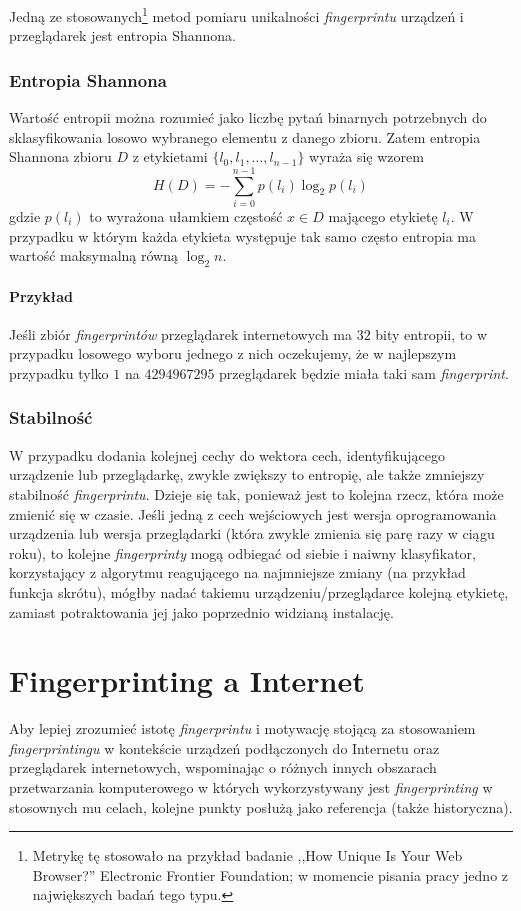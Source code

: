 Jedną ze stosowanych\footnote{Metrykę tę stosowało na przykład badanie ,,How
	Unique Is Your Web Browser?'' Electronic Frontier Foundation; w momencie
pisania pracy jedno z największych badań tego typu.} metod pomiaru unikalności
\emph{fingerprintu} urządzeń i przeglądarek jest entropia Shannona.

\subsubsection{Entropia Shannona}
Wartość entropii można rozumieć jako liczbę pytań binarnych potrzebnych do
sklasyfikowania losowo wybranego elementu z danego zbioru. Zatem entropia
Shannona zbioru \(D\) z etykietami \(\{l_{0}, l_{1}, \dots, l_{n - 1}\}\) wyraża
się wzorem \[H(D) = -{\sum_{i = 0}^{n - 1}{p(l_{i})\log_{2}{p(l_{i})}}}\] gdzie
\(p(l_{i})\) to wyrażona ułamkiem częstość \(x \in D\) mającego etykietę
\(l_{i}\). W przypadku w którym każda etykieta występuje tak samo często
entropia ma wartość maksymalną równą \(\log_{2}{n}\).

\paragraph{Przykład}
Jeśli zbiór \emph{fingerprintów} przeglądarek internetowych ma \(32\) bity
entropii, to w przypadku losowego wyboru jednego z nich oczekujemy, że w
najlepszym przypadku tylko \(1\) na \(4294967295\) przeglądarek będzie miała
taki sam \emph{fingerprint}.

\subsubsection{Stabilność}
W przypadku dodania kolejnej cechy do wektora cech, identyfikującego urządzenie
lub przeglądarkę, zwykle zwiększy to entropię, ale także zmniejszy stabilność
\emph{fingerprintu}. Dzieje się tak, ponieważ jest to kolejna rzecz, która może
zmienić się w czasie. Jeśli jedną z cech wejściowych jest wersja oprogramowania
urządzenia lub wersja przeglądarki (która zwykle zmienia się parę razy w ciągu
roku), to kolejne \emph{fingerprinty} mogą odbiegać od siebie i naiwny
klasyfikator, korzystający z algorytmu reagującego na najmniejsze zmiany (na
przykład funkcja skrótu), mógłby nadać takiemu urządzeniu/przeglądarce kolejną
etykietę, zamiast potraktowania jej jako poprzednio widzianą instalację.

\section{Fingerprinting a Internet} %
Aby lepiej zrozumieć istotę \emph{fingerprintu} i motywację stojącą za
stosowaniem \emph{fingerprintingu} w kontekście urządzeń podłączonych do
Internetu oraz przeglądarek internetowych, wspominając o różnych innych
obszarach przetwarzania komputerowego w których wykorzystywany jest
\emph{fingerprinting} w stosownych mu celach, kolejne punkty posłużą jako
referencja (także historyczna).


